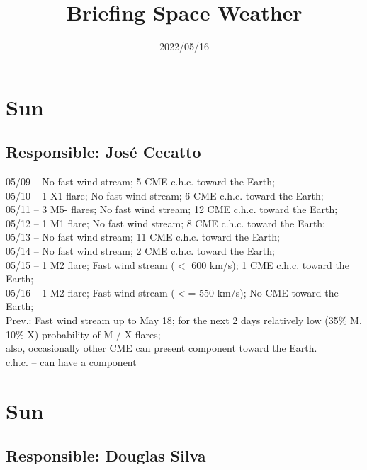 \documentclass[a4paper, 10pt]{article}
\title{\Large{\textbf{Briefing Space Weather}}}
\date{2022/05/16}
\begin{document}
\maketitle 

  \thispagestyle{fancy} \section{Sun} 
 \subsection{Responsible: José Cecatto}

05/09 – No fast wind stream; 5 CME c.h.c. toward the Earth; \\ 05/10 – 1 X1 flare; No fast wind stream; 6 CME c.h.c. toward the Earth; \\ 05/11 – 3 M5- flares; No fast wind stream; 12 CME c.h.c. toward the Earth; \\ 05/12 – 1 M1 flare; No fast wind stream; 8 CME c.h.c. toward the Earth; \\ 05/13 – No fast wind stream; 11 CME c.h.c. toward the Earth; \\ 05/14 – No fast wind stream; 2 CME c.h.c. toward the Earth; \\ 05/15 – 1 M2 flare; Fast wind stream ($<$ 600 km/s); 1 CME c.h.c. toward the Earth; \\ 05/16 – 1 M2 flare; Fast wind stream ($<$= 550 km/s); No CME toward the Earth; \\ Prev.: Fast wind stream up to May 18; for the next 2 days relatively low (35\% M, 10\% X) probability of M / X flares; \\ also, occasionally other CME can present component toward the Earth. \\ c.h.c. – can have a component\section{Sun} 
 \subsection{Responsible: Douglas Silva}
\end{document}
